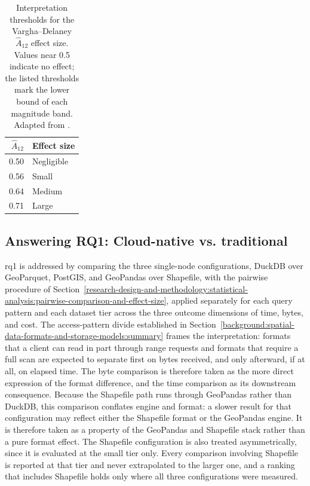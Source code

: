 \begin{table}[H]
	\centering
	\begin{tabular}{@{}rl@{}}
		\toprule
		$\hat{A}_{12}$ & Effect size \\
		\midrule
		\num{0.50} & Negligible \\
		\num{0.56} & Small \\
		\num{0.64} & Medium \\
		\num{0.71} & Large \\
		\bottomrule
	\end{tabular}
	\caption[Vargha--Delaney effect-size thresholds]{Interpretation thresholds for the Vargha--Delaney $\hat{A}_{12}$ effect size. Values near \num{0.5} indicate no effect; the listed thresholds mark the lower bound of each magnitude band. Adapted from \textcite{arcuri2014_hitchhiker_statistical_tests}.}
	\label{tab:vargha-delaney-thresholds}
\end{table}

\subsection{Answering RQ1: Cloud-native vs. traditional}
\label{research-design-and-methodology:statistical-analysis:answering-rq1-cloud-native-vs-traditional}
\acrshort{rq}1 is addressed by comparing the three single-node configurations, DuckDB over GeoParquet, PostGIS, and GeoPandas over Shapefile, with the pairwise procedure of Section~\ref{research-design-and-methodology:statistical-analysis:pairwise-comparison-and-effect-size}, applied separately for each query pattern and each dataset tier across the three outcome dimensions of time, bytes, and cost. The access-pattern divide established in Section~\ref{background:spatial-data-formats-and-storage-models:summary} frames the interpretation: formats that a client can read in part through range requests and formats that require a full scan are expected to separate first on bytes received, and only afterward, if at all, on elapsed time. The byte comparison is therefore taken as the more direct expression of the format difference, and the time comparison as its downstream consequence. Because the Shapefile path runs through GeoPandas rather than DuckDB, this comparison conflates engine and format: a slower result for that configuration may reflect either the Shapefile format or the GeoPandas engine. It is therefore taken as a property of the GeoPandas and Shapefile stack rather than a pure format effect. The Shapefile configuration is also treated asymmetrically, since it is evaluated at the small tier only. Every comparison involving Shapefile is reported at that tier and never extrapolated to the larger one, and a ranking that includes Shapefile holds only where all three configurations were measured.

